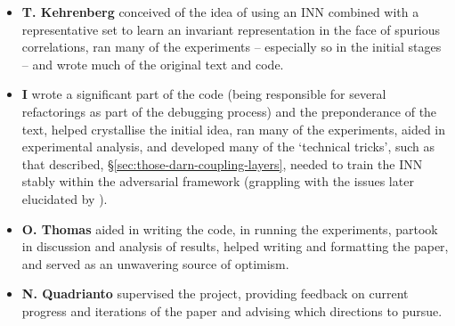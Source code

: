 %
{\renewcommand\labelitemi{}
%
\begin{itemize}
    \item 
        \textbf{T. Kehrenberg} conceived of the idea of using an \ac{INN} combined with a
        representative set to learn an invariant representation in the face of spurious
        correlations, ran many of the experiments -- especially so in the initial stages -- and
        wrote much of the original text and code.
    \item 
        \textbf{I} wrote a significant part of the code (being responsible for several refactorings
        as part of the debugging process) and the preponderance of the text, helped crystallise the initial
        idea, ran many of the experiments, aided in experimental analysis, and developed many of
        the `technical tricks', such as that described, \S\ref{sec:those-darn-coupling-layers},
        needed to train the \ac{INN} stably within the adversarial framework (grappling with the
        issues later elucidated by \citet{behrmann2021understanding}).
    \item 
        \textbf{O. Thomas} aided in writing the code, in running the experiments, partook in
        discussion and analysis of results, helped writing and formatting the paper, and served as
        an unwavering source of optimism.
    \item
        \textbf{N. Quadrianto} supervised the project, providing feedback on current progress and
        iterations of the paper and advising which directions to pursue.
\end{itemize}
%
}
